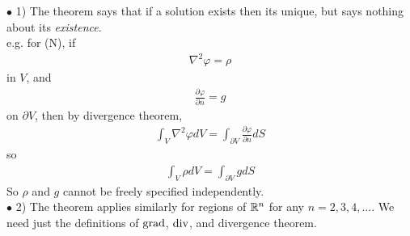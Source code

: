 \documentclass[a4paper]{article}
\begin{document}
\begin{rem}
$\bullet$ 1) The theorem says that if a solution exists then its unique, but says nothing about its \emph{existence}.\\
e.g. for (N), if
\begin{equation*}
\begin{aligned}
\nabla^2\varphi = \rho
\end{aligned}
\end{equation*}
in $V$, and
\begin{equation*}
\begin{aligned}
\frac{\partial \varphi}{\partial n} = g
\end{aligned}
\end{equation*}
on $\partial V$, then by divergence theorem,
\begin{equation*}
\begin{aligned}
\int_V \nabla^2\varphi dV = \int_{\partial V} \frac{\partial \varphi}{\partial n}dS
\end{aligned}
\end{equation*}
so
\begin{equation*}
\begin{aligned}
\int_V \rho dV = \int_{\partial V} g dS
\end{aligned}
\end{equation*}
So $\rho$ and $g$ cannot be freely specified independently.\\

$\bullet$ 2) The theorem applies similarly for regions of $\mathbb{R}^n$ for any $n=2,3,4,...$. We need just the definitions of $\operatorname{grad}$, $\operatorname{div}$, and divergence theorem.\\


\end{rem}
\end{document}
